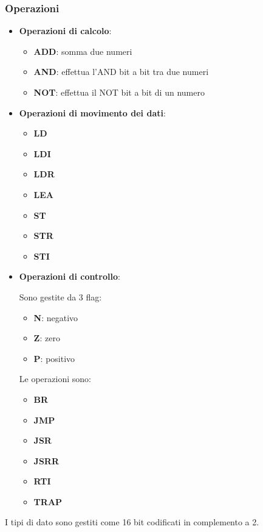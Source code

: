 \documentclass[a4paper]{article}
\theoremstyle{break}
\theoremstyle{break}
\theoremstyle{break}
\theoremstyle{break}
\begin{document}
\subsubsection{Operazioni}
\begin{itemize}
	\item \textbf{Operazioni di calcolo}:
	      \begin{itemize}
		      \item \textbf{ADD}: somma due numeri
		      \item \textbf{AND}: effettua l'AND bit a bit tra due numeri
		      \item \textbf{NOT}: effettua il NOT bit a bit di un numero
	      \end{itemize}
	\item \textbf{Operazioni di movimento dei dati}:
	      \begin{itemize}
		      \item \textbf{LD}
		      \item \textbf{LDI}
		      \item \textbf{LDR}
		      \item \textbf{LEA}
		      \item \textbf{ST}
		      \item \textbf{STR}
		      \item \textbf{STI}
	      \end{itemize}
	\item \textbf{Operazioni di controllo}:

	      \noindent Sono gestite da 3 flag:
	      \begin{itemize}
		      \item \textbf{N}: negativo
		      \item \textbf{Z}: zero
		      \item \textbf{P}: positivo
	      \end{itemize}
	      Le operazioni sono:
	      \begin{itemize}
		      \item \textbf{BR}
		      \item \textbf{JMP}
		      \item \textbf{JSR}
		      \item \textbf{JSRR}
		      \item \textbf{RTI}
		      \item \textbf{TRAP}
	      \end{itemize}
\end{itemize}

I tipi di dato sono gestiti come 16 bit codificati in complemento a 2.
\end{document}
